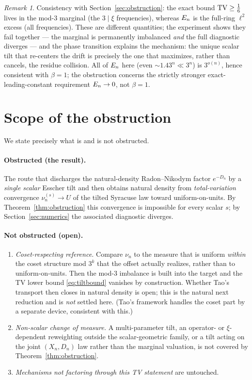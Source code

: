 \documentclass[11pt]{amsart}
\theoremstyle{definition}
\theoremstyle{remark}
\newtheorem{remark}[theorem]{Remark}
\begin{document}
\begin{remark}
Consistency with Section~\ref{sec:obstruction}: the exact bound $\mathrm{TV}\ge\tfrac16$ lives in the mod-$3$
marginal (the $3\mid\xi$ frequencies), whereas $E_n$ is the full-ring $\ell^2$ excess (all
frequencies). These are different quantities; the experiment shows they fail together --- the marginal
is permanently imbalanced \emph{and} the full diagnostic diverges --- and the phase transition explains
the mechanism: the unique scalar tilt that re-centers the drift is precisely the one that maximizes,
rather than cancels, the residue collision. All of $E_n$ here (even $\sim1.43^n\ll3^n$) is $3^{o(n)}$,
hence consistent with $\beta=1$; the obstruction concerns the strictly stronger exact-leading-constant
requirement $E_n\to0$, not $\beta=1$.
\end{remark}

\section{Scope of the obstruction}
\label{sec:scope}

We state precisely what is and is not obstructed.

\paragraph{Obstructed (the result).}
The route that discharges the natural-density Radon--Nikodym factor $e^{-D_n}$ by a \emph{single scalar}
Esscher tilt and then obtains natural density from \emph{total-variation} convergence $\nu_n^{(s)}\to U$
of the tilted Syracuse law toward uniform-on-units. By Theorem~\ref{thm:obstruction} this convergence is
impossible for every scalar $s$; by Section~\ref{sec:numerics} the associated diagnostic diverges.

\paragraph{Not obstructed (open).}
\begin{enumerate}[label=(\roman*)]
\item \emph{Coset-respecting reference.} Compare $\nu_n$ to the measure that is uniform \emph{within} the
coset structure mod $3^k$ that the offset actually realizes, rather than to uniform-on-units. Then the
mod-$3$ imbalance is built into the target and the TV lower bound \eqref{eq:tiltbound} vanishes by
construction. Whether Tao's transport then closes in natural density is open; this is the natural next
reduction and is \emph{not} settled here. (Tao's framework handles the coset part by a separate device,
consistent with this.)
\item \emph{Non-scalar change of measure.} A multi-parameter tilt, an operator- or $\xi$-dependent
reweighting outside the scalar-geometric family, or a tilt acting on the joint $(X_n,D_n)$ law rather
than the marginal valuation, is not covered by Theorem~\ref{thm:obstruction}.
\item \emph{Mechanisms not factoring through this TV statement} are untouched.
\end{enumerate}
\end{document}
